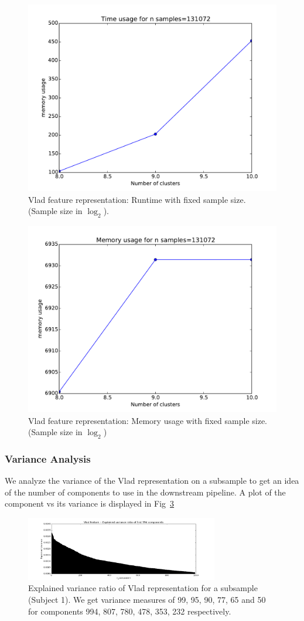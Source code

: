 \documentclass[final,leqno,onefignum,onetabnum]{siamltexmm}
\begin{document}
\begin{figure}
  \centering
  \includegraphics[width=0.60\linewidth]{images/vladTimeFixedSample}
  \caption{Vlad feature representation: Runtime with fixed sample size. (Sample size in $\log_{2}$).\label{fig:vlad_time_fixed_sample}}
\end{figure}
\begin{figure}
  \centering
  \includegraphics[width=0.60\linewidth]{images/vladMemoryFixedSample}
  \caption{Vlad feature representation: Memory usage with fixed sample size. (Sample size in $\log_{2}$)\label{fig:vlad_memory_fixed_sample}}
\end{figure}

\subsubsection{Variance Analysis}
We analyze the variance of the Vlad representation on a subsample to get an idea of the number of components to use in the downstream pipeline.  A plot of the component vs its variance is displayed in Fig~\ref{fig:vlad_variance}
\begin{figure}
  \centering
  \includegraphics[width=0.75\textwidth]{images/vlad_variance}
  \caption{Explained variance ratio of Vlad representation for a subsample (Subject 1).  We get variance measures of 99, 95, 90, 77, 65 and 50 for components 994, 807, 780, 478, 353, 232 respectively.\label{fig:vlad_variance}} 
\end{figure}
\end{document}
